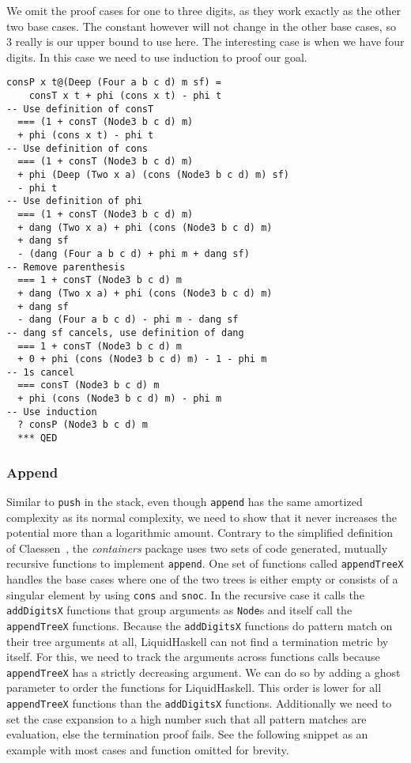 \documentclass[sigplan,screen]{acmart}
\begin{document}
We omit the proof cases for one to three digits, as they work exactly as the other two base cases. The constant however will not change in the other base cases, so $3$ really is our upper bound to use here. The interesting case is when we have four digits. In this case we need to use induction to proof our goal.

\begin{lstlisting}
consP x t@(Deep (Four a b c d) m sf) =
    consT x t + phi (cons x t) - phi t
-- Use definition of consT
  === (1 + consT (Node3 b c d) m)
  + phi (cons x t) - phi t
-- Use definition of cons
  === (1 + consT (Node3 b c d) m)
  + phi (Deep (Two x a) (cons (Node3 b c d) m) sf)
  - phi t
-- Use definition of phi
  === (1 + consT (Node3 b c d) m)
  + dang (Two x a) + phi (cons (Node3 b c d) m)
  + dang sf
  - (dang (Four a b c d) + phi m + dang sf)
-- Remove parenthesis
  === 1 + consT (Node3 b c d) m
  + dang (Two x a) + phi (cons (Node3 b c d) m)
  + dang sf
  - dang (Four a b c d) - phi m - dang sf
-- dang sf cancels, use definition of dang
  === 1 + consT (Node3 b c d) m
  + 0 + phi (cons (Node3 b c d) m) - 1 - phi m
-- 1s cancel
  === consT (Node3 b c d) m
  + phi (cons (Node3 b c d) m) - phi m
-- Use induction
  ? consP (Node3 b c d) m
  *** QED
\end{lstlisting}

\subsubsection{Append}\label{sec:append}

Similar to \texttt{push} in the stack, even though \texttt{append} has the same amortized complexity as its normal complexity, we need to show that it never increases the potential more than a logarithmic amount. Contrary to the simplified definition of Claessen~\cite{fingertrees_new}, the \textit{containers} package uses two sets of code generated, mutually recursive functions to implement \texttt{append}. One set of functions called \texttt{appendTreeX} handles the base cases where one of the two trees is either empty or consists of a singular element by using \texttt{cons} and \texttt{snoc}. In the recursive case it calls the \texttt{addDigitsX} functions that group arguments as \texttt{Node}s and itself call the \texttt{appendTreeX} functions. Because the \texttt{addDigitsX} functions do pattern match on their tree arguments at all, LiquidHaskell can not find a termination metric by itself. For this, we need to track the arguments across functions calls because \texttt{appendTreeX} has a strictly decreasing argument. We can do so by adding a ghost parameter to order the functions for LiquidHaskell. This order is lower for all \texttt{appendTreeX} functions than the \texttt{addDigitsX} functions. Additionally we need to set the case expansion to a high number such that all pattern matches are evaluation, else the termination proof fails. See the following snippet as an example with most cases and function omitted for brevity.
\end{document}

